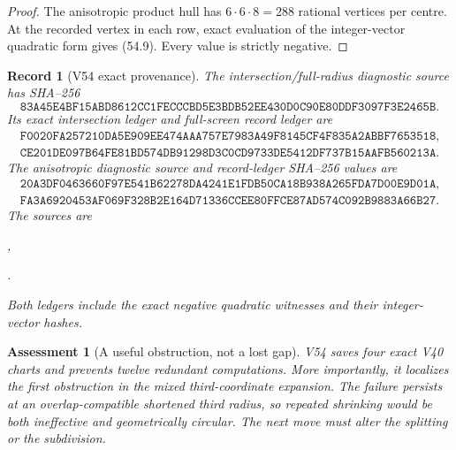 \documentclass[11pt,oneside]{article}
\newtheorem{assessment}[theorem]{Assessment}
\newtheorem{record}[theorem]{Record}
\theoremstyle{definition}
\theoremstyle{remark}
\begin{document}
\begin{proof}
The anisotropic product hull has \(6\cdot6\cdot8=288\) rational
vertices per centre.  At the recorded vertex in each row, exact
evaluation of the integer-vector quadratic form gives (54.9).
Every value is strictly negative.
\end{proof}

\begin{record}[V54 exact provenance]
\label{rec:newv54-provenance}
The intersection/full-radius diagnostic source has SHA--256
\[
\texttt{83A45E4BF15ABD8612CC1FECCCBD5E3BDB52EE430D0C90E80DDF3097F3E2465B}.
                                                               \tag{54.10}
\]
Its exact intersection ledger and full-screen record ledger are
\[
\begin{gathered}
\texttt{F0020FA257210DA5E909EE474AAA757E7983A49F8145CF4F835A2ABBF7653518},\\
\texttt{CE201DE097B64FE81BD574DB91298D3C0CD9733DE5412DF737B15AAFB560213A}.
\end{gathered}                                         \tag{54.11}
\]
The anisotropic diagnostic source and record-ledger SHA--256
values are
\[
\begin{gathered}
\texttt{20A3DF0463660F97E541B62278DA4241E1FDB50CA18B938A265FDA7D00E9D01A},\\
\texttt{FA3A6920453AF069F328B2E164D71336CCEE80FFCE87AD574C092B9883A66B27}.
\end{gathered}                                         \tag{54.12}
\]
The sources are
\begin{center}
\footnotesize
{},
\par
{}.
\end{center}
Both ledgers include the exact negative quadratic witnesses and
their integer-vector hashes.
\end{record}

\begin{assessment}[A useful obstruction, not a lost gap]
\label{ass:newv54}
V54 saves four exact V40 charts and prevents twelve redundant
computations.  More importantly, it localizes the first obstruction
in the mixed third-coordinate expansion.  The failure persists at
an overlap-compatible shortened third radius, so repeated shrinking
would be both ineffective and geometrically circular.  The next
move must alter the splitting or the subdivision.
\end{assessment}
\end{document}
